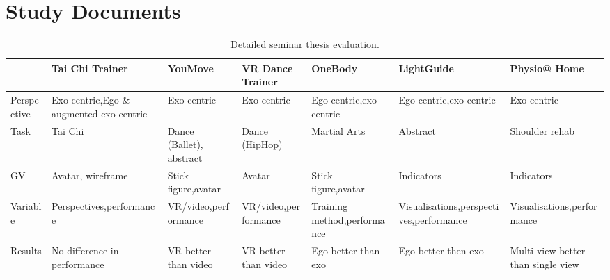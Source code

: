 \section{Study Documents}
%
\begin{table}[]
	\begin{tabularx}{\textwidth}{@{}X|XXXXXX@{}}
		\toprule
		& Tai Chi Trainer \cite{thaichichua}   & YouMove \cite{YouMove} & VR Dance Trainer \cite{vrdancetrainer} & OneBody \cite{onebody} & LightGuide \cite{lightguide} & Physio@ Home \cite{physioathome} \\ \midrule
		Perspective &
		Exo-centric,\newline Ego \& augmented exo-centric &
		Exo-centric &
		Exo-centric &
		Ego-centric,\newline exo-centric &
		Ego-centric,\newline exo-centric &
		Exo-centric \\ 
		Task & Tai Chi & Dance (Ballet), abstract & Dance (HipHop)   & Martial Arts         & Abstract   & Shoulder rehab \\ 
		GV   & Avatar, \newline wireframe & Stick figure,\newline avatar     & Avatar           & Stick figure,\newline avatar & Indicators & Indicators     \\ 
		Variable &
		Perspectives,\newline performance &
		VR/video,\newline performance &
		VR/video,\newline performance &
		Training method,\newline performance &
		Visualisations,\newline perspectives,\newline performance &
		Visualisations,\newline performance \\ 
		Results &
		No \newline difference in performance &
		VR better than video &
		VR better than video &
		Ego better than exo &
		Ego better then exo &
		Multi view better than single view \\ 
		\bottomrule
	\end{tabularx}
	\caption[Detailed analysis of related work in seminar thesis.]{Detailed seminar thesis evaluation.}
	\label{tab:rw_overview_detail}
\end{table}